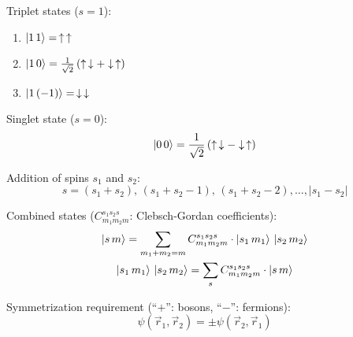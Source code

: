 \documentclass[fontsize=11pt,a4paper]{scrartcl}
\begin{document}
Triplet states ($s=1$):
\begin{enumerate}
	\item $\ket{1\,1} = \,\uparrow\,\uparrow$
	\item $\ket{1\,0} = \frac{1}{\sqrt{2}}\left(\uparrow\,\downarrow+\downarrow\,\uparrow\right)$
	\item $\ket{1\,(-1)} = \,\downarrow\,\downarrow$
\end{enumerate}

Singlet state ($s=0$):
\[
	\ket{0\,0} = \frac{1}{\sqrt{2}}\left(\uparrow\,\downarrow-\downarrow\,\uparrow\right)
\]

Addition of spins $s_1$ and $s_2$:
\[
	s=(s_1+s_2),\,(s_1+s_2-1),\,(s_1+s_2-2),\dots,|s_1-s_2|
\]

Combined states ($C_{m_1 m_2 m}^{s_1 s_2 s}$: Clebsch-Gordan coefficients):
\begin{gather*}
	\ket{s\,m}=\sum_{m_1+m_2=m} C_{m_1 m_2 m}^{s_1 s_2 s}\cdot\ket{s_1\,m_1}\,\ket{s_2\,m_2}\\
	\ket{s_1\,m_1}\,\ket{s_2\,m_2}=\sum_s C_{m_1 m_2 m}^{s_1 s_2 s}\cdot\ket{s\,m}
\end{gather*}

Symmetrization requirement (``$+$'': bosons, ``$-$'': fermions):
\[
	\psi(\vec r_1,\vec r_2)=\pm\psi(\vec r_2,\vec r_1)
\]
\end{document}
